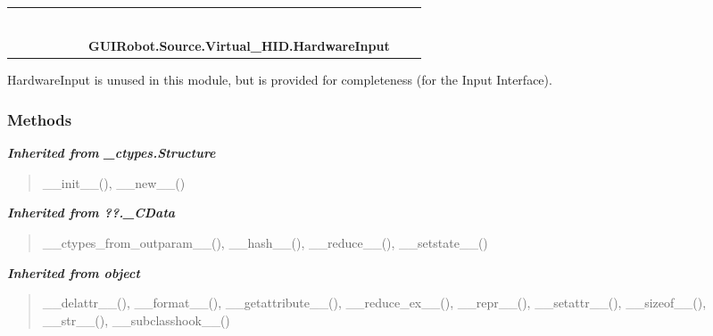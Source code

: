     \label{GUIRobot:Source:Virtual_HID:HardwareInput}
\begin{tabular}{cccccccccc}
\multicolumn{2}{r}{\settowidth{\BCL}{object}\multirow{2}{\BCL}{object}}
&&
&&
&&
  \\\cline{3-3}
  &&\multicolumn{1}{c|}{}
&&
&&
&&
  \\
\multicolumn{4}{r}{\settowidth{\BCL}{??.\_CData}\multirow{2}{\BCL}{??.\_CData}}
&&
&&
  \\\cline{5-5}
  &&&&\multicolumn{1}{c|}{}
&&
&&
  \\
\multicolumn{6}{r}{\settowidth{\BCL}{\_ctypes.Structure}\multirow{2}{\BCL}{\_ctypes.Structure}}
&&
  \\\cline{7-7}
  &&&&&&\multicolumn{1}{c|}{}
&&
  \\
&&&&&&\multicolumn{2}{l}{\textbf{GUIRobot.Source.Virtual\_HID.HardwareInput}}
\end{tabular}

HardwareInput is unused in this module, but is provided for completeness 
(for the Input Interface).



  \subsubsection{Methods}


\large{\textbf{\textit{Inherited from \_ctypes.Structure}}}

\begin{quote}
\_\_init\_\_(), \_\_new\_\_()
\end{quote}

\large{\textbf{\textit{Inherited from ??.\_CData}}}

\begin{quote}
\_\_ctypes\_from\_outparam\_\_(), \_\_hash\_\_(), \_\_reduce\_\_(), \_\_setstate\_\_()
\end{quote}

\large{\textbf{\textit{Inherited from object}}}

\begin{quote}
\_\_delattr\_\_(), \_\_format\_\_(), \_\_getattribute\_\_(), \_\_reduce\_ex\_\_(), \_\_repr\_\_(), \_\_setattr\_\_(), \_\_sizeof\_\_(), \_\_str\_\_(), \_\_subclasshook\_\_()
\end{quote}

